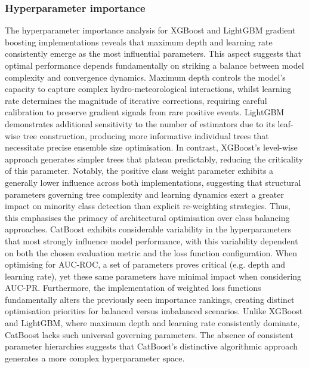 \documentclass[nhess, manuscript]{copernicus}
\begin{document}
\subsubsection{Hyperparameter importance}

The hyperparameter importance analysis for XGBoost and LightGBM gradient boosting implementations reveals that maximum depth and learning rate consistently emerge as the most influential parameters. This aspect suggests that optimal performance depends fundamentally on striking a balance between model complexity and convergence dynamics. Maximum depth controls the model's capacity to capture complex hydro-meteorological interactions, whilst learning rate determines the magnitude of iterative corrections, requiring careful calibration to preserve gradient signals from rare positive events. LightGBM demonstrates additional sensitivity to the number of estimators due to its leaf-wise tree construction, producing more informative individual trees that necessitate precise ensemble size optimisation. In contrast, XGBoost's level-wise approach generates simpler trees that plateau predictably, reducing the criticality of this parameter. Notably, the positive class weight parameter exhibits a generally lower influence across both implementations, suggesting that structural parameters governing tree complexity and learning dynamics exert a greater impact on minority class detection than explicit re-weighting strategies. Thus, this emphasises the primacy of architectural optimisation over class balancing approaches. CatBoost exhibits considerable variability in the hyperparameters that most strongly influence model performance, with this variability dependent on both the chosen evaluation metric and the loss function configuration. When optimising for AUC-ROC, a set of parameters proves critical (e.g. depth and learning rate), yet these same parameters have minimal impact when considering AUC-PR. Furthermore, the implementation of weighted loss functions fundamentally alters the previously seen importance rankings, creating distinct optimisation priorities for balanced versus imbalanced scenarios. Unlike XGBoost and LightGBM, where maximum depth and learning rate consistently dominate, CatBoost lacks such universal governing parameters. The absence of consistent parameter hierarchies suggests that CatBoost's distinctive algorithmic approach generates a more complex hyperparameter space. 
\end{document}
